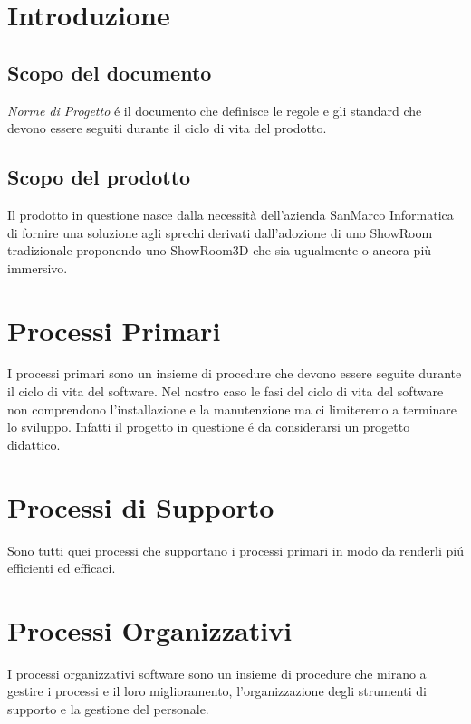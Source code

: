 \documentclass[a4paper]{article}
\begin{document}




\pagebreak

{
    \hypersetup{linkcolor=black}
    \tableofcontents
}
\pagebreak

\section{Introduzione}
\subsection{Scopo del documento}
\textit{Norme di Progetto} é il documento che definisce le regole e gli standard che devono essere seguiti durante il ciclo di vita del prodotto.
\subsection{Scopo del prodotto}
Il prodotto in questione nasce dalla necessità dell'azienda SanMarco Informatica di fornire una soluzione agli sprechi
derivati dall'adozione di uno ShowRoom tradizionale proponendo uno ShowRoom3D che sia ugualmente o ancora più immersivo.
\section{Processi Primari}
I processi primari sono un insieme di procedure che devono essere seguite  durante il ciclo di vita del software.
Nel nostro caso le fasi del ciclo di vita del software non comprendono l'installazione e la manutenzione ma ci limiteremo a terminare lo sviluppo.
Infatti il progetto in questione é da considerarsi un progetto didattico.

\pagebreak
\section{Processi di Supporto}
Sono tutti quei processi che supportano i processi primari in modo da renderli piú efficienti ed efficaci.

\pagebreak
\section{Processi Organizzativi}
I processi organizzativi software sono un insieme di procedure che mirano a gestire i processi e il loro miglioramento, l'organizzazione degli strumenti 
di supporto e la gestione del personale.

\pagebreak

\pagebreak

\pagebreak
\end{document}
